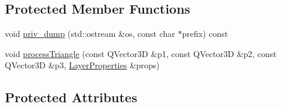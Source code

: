 \subsection*{Protected Member Functions}
\begin{DoxyCompactItemize}
\item 
void \hyperlink{classShipCADGeometry_1_1SubdivisionLayer_a80009b02c31a01e2de9f93d5982b9a63}{priv\-\_\-dump} (std\-::ostream \&os, const char $\ast$prefix) const 
\item 
void \hyperlink{classShipCADGeometry_1_1SubdivisionLayer_abea7581d3e0b740de8db1dfd6bc9bf69}{process\-Triangle} (const Q\-Vector3\-D \&p1, const Q\-Vector3\-D \&p2, const Q\-Vector3\-D \&p3, \hyperlink{structShipCADGeometry_1_1LayerProperties}{Layer\-Properties} \&props)
\end{DoxyCompactItemize}
\subsection*{Protected Attributes}
